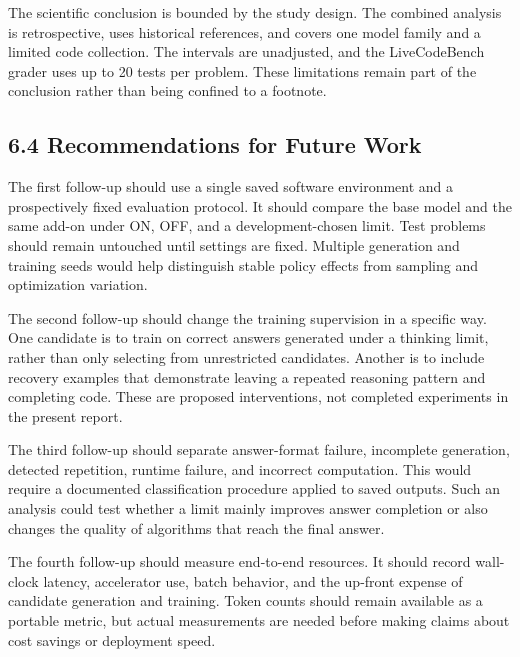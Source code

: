 \documentclass[11pt,letterpaper]{article}
\begin{document}
The scientific conclusion is bounded by the study design. The combined analysis is retrospective, uses historical references, and covers one model family and a limited code collection. The intervals are unadjusted, and the LiveCodeBench grader uses up to 20 tests per problem. These limitations remain part of the conclusion rather than being confined to a footnote.\par

\subsection*{6.4 Recommendations for Future Work}

The first follow-up should use a single saved software environment and a prospectively fixed evaluation protocol. It should compare the base model and the same add-on under ON, OFF, and a development-chosen limit. Test problems should remain untouched until settings are fixed. Multiple generation and training seeds would help distinguish stable policy effects from sampling and optimization variation.\par

The second follow-up should change the training supervision in a specific way. One candidate is to train on correct answers generated under a thinking limit, rather than only selecting from unrestricted candidates. Another is to include recovery examples that demonstrate leaving a repeated reasoning pattern and completing code. These are proposed interventions, not completed experiments in the present report.\par

The third follow-up should separate answer-format failure, incomplete generation, detected repetition, runtime failure, and incorrect computation. This would require a documented classification procedure applied to saved outputs. Such an analysis could test whether a limit mainly improves answer completion or also changes the quality of algorithms that reach the final answer.\par

The fourth follow-up should measure end-to-end resources. It should record wall-clock latency, accelerator use, batch behavior, and the up-front expense of candidate generation and training. Token counts should remain available as a portable metric, but actual measurements are needed before making claims about cost savings or deployment speed.\par
\end{document}
